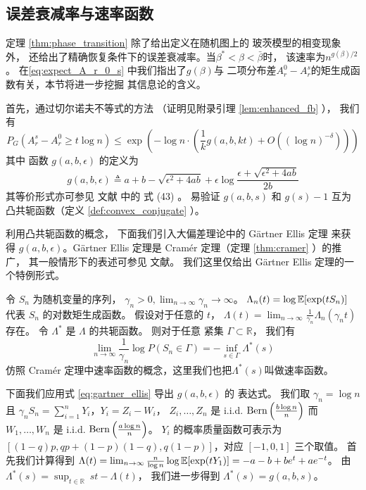 \subsection{误差衰减率与速率函数}\label{sub:rate_function}
定理 \ref{thm:phase_transition} 除了给出定义在随机图上的
玻茨模型的相变现象外，
还给出了精确恢复条件下的误差衰减率。当$\beta^*<\beta<\bar{\beta}$时，
该速率为$n^{g(\beta)/2}$。
在\eqref{eq:expect_A_r_0_s} 中我们指出了$g(\beta)$与
二项分布差$A_r^0 - A_r^s$的矩生成函数有关，本节将进一步挖掘
其信息论的含义。

首先，通过切尔诺夫不等式的方法
（证明见附录引理 \ref{lem:enhanced_fb} ），
我们有
\begin{equation}\label{eq:introduction_g_a_b_eps}
  P_G(A_r^s - A_r^0 \ge t  \log n) 
	\le  \exp\left(-\log n \cdot
	\left(
   \frac{1}{k} g(a,b,kt) + O\left((\log n)^{-\delta} \right) \right)\right)
\end{equation}
其中 函数 $g(a,b,\epsilon)$ 的定义为
\begin{equation}  \label{equation:g}
  g(a,b,\epsilon) \triangleq a + b - \sqrt{\epsilon^2 + 4ab} + \epsilon \log \frac{\epsilon + \sqrt{\epsilon^2 + 4ab}}{2b}
\end{equation}
其等价形式亦可参见 文献 中的 式 (43)
。
易验证
$g(a,b,s)$ 和 $g(s)-1$ 互为凸共轭函数（定义 \ref{def:convex_conjugate} ）。

利用凸共轭函数的概念，
下面我们引入大偏差理论中的 Gärtner Ellis 定理
来获得 $g(a,b,\epsilon)$。Gärtner Ellis 定理是
Cramér 定理（定理 \ref{thm:cramer} ）的推广，
其一般情形下的表述可参见
文献。
我们这里仅给出 Gärtner Ellis 定理的一个特例形式。

令 $S_n$ 为随机变量的序列，
$\gamma_n >0, \lim_{n\to \infty}\gamma_n \to \infty$。
$\Lambda_n(t)=\log \operatorname{\mathbb{E}}[\exp(t S_n)]$ 代表 $S_n$ 的对数矩生成函数。
假设对于任意的 $t$，
$\Lambda(t) =\lim_{n\to \infty} \frac{1}{\gamma_n}\Lambda_n(\gamma_n t)$
存在。 令 $\Lambda^*$ 是 $\Lambda$ 的共轭函数。
则对于任意 紧集 $\Gamma \subset \mathbb{R}$，
我们有
\begin{equation}\label{eq:gartner_ellis}
\lim_{n\to \infty} \frac{1}{\gamma_n}\log P(S_n \in \Gamma) = -\inf_{s \in \Gamma} \Lambda^*(s)
\end{equation}
仿照 Cramér 定理中速率函数的概念，这里我们也把$\Lambda^*(s)$叫做速率函数。

下面我们应用式 \eqref{eq:gartner_ellis}
导出 $g(a,b,\epsilon)$ 的
表达式。
我们取 $\gamma_n= \log n$ 且 $\gamma_n S_n = \sum_{i=1}^n Y_i$，$Y_i=Z_i - W_i$，
$Z_i, \dots, Z_n$ 是 i.i.d. $\operatorname{Bern}\left(\frac{b \log n}{n}\right)$ 而 $W_1, \dots, W_n$ 是 i.i.d. $\operatorname{Bern}\left(\frac{a \log n}{n}\right)$。
$Y_i$ 的概率质量函数可表示为 $[(1-q)p, qp+(1-p)(1-q), q(1-p)]$，对应 $[-1,0,1]$ 三个取值。
首先我们计算得到 
$\Lambda(t) = \lim_{n\to \infty} \frac{n}{\log n} \log \operatorname{\mathbb{E}}[\exp(t Y_1)]
=-a-b+be^t  + ae^{-t}$。
由 $\Lambda^*(s) = \sup_{t\in\mathbb{R}}\ st - \Lambda(t)$，
我们进一步得到 $\Lambda^*(s) = g(a,b,s)$。

